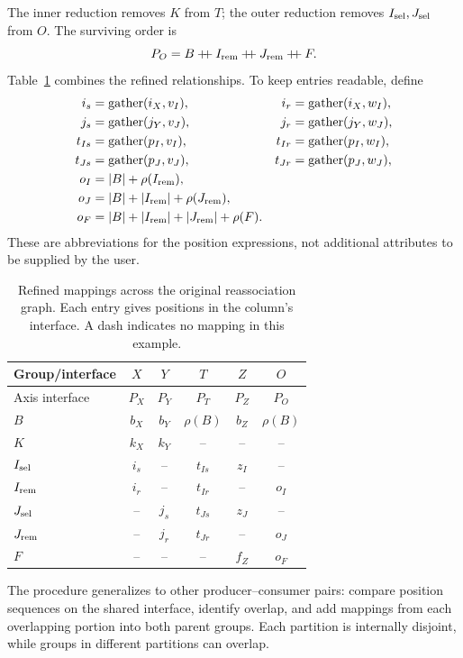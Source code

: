 The inner reduction removes $K$ from $T$; the outer reduction removes
$I_{\mathrm{sel}},J_{\mathrm{sel}}$ from $O$. The surviving order is
\begin{equation}
 P_O=B\mathbin{+\!\!+}I_{\mathrm{rem}}\mathbin{+\!\!+}J_{\mathrm{rem}}\mathbin{+\!\!+} F.
\label{eq:source-output}
\end{equation}
Table~\ref{tab:refined-mappings} combines the refined relationships. To keep
entries readable, define
\begin{equation}
\begin{aligned}
 i_s&=\operatorname{gather}(i_X,v_I),&i_r&=\operatorname{gather}(i_X,w_I),\\
 j_s&=\operatorname{gather}(j_Y,v_J),&j_r&=\operatorname{gather}(j_Y,w_J),\\
 t_{Is}&=\operatorname{gather}(p_I,v_I),&t_{Ir}&=\operatorname{gather}(p_I,w_I),\\
 t_{Js}&=\operatorname{gather}(p_J,v_J),&t_{Jr}&=\operatorname{gather}(p_J,w_J),\\
 o_I&=|B|+\rho(I_{\mathrm{rem}}),\\
 o_J&=|B|+|I_{\mathrm{rem}}|+\rho(J_{\mathrm{rem}}),\\
 o_F&=|B|+|I_{\mathrm{rem}}|+|J_{\mathrm{rem}}|+\rho(F).
\end{aligned}
\end{equation}
These are abbreviations for the position expressions, not additional
attributes to be supplied by the user.
\begin{table}[htbp]
\caption{Refined mappings across the original reassociation graph. Each entry
gives positions in the column's interface. A dash indicates no mapping in
this example.}
\label{tab:refined-mappings}
\centering
\begin{tabular}{@{}lccccc@{}}\toprule
Group/interface & $X$ & $Y$ & $T$ & $Z$ & $O$\\\midrule
Axis interface & $P_X$ & $P_Y$ & $P_T$ & $P_Z$ & $P_O$\\
$B$ & $b_X$ & $b_Y$ & $\rho(B)$ & $b_Z$ & $\rho(B)$\\
$K$ & $k_X$ & $k_Y$ & -- & -- & --\\
$I_{\mathrm{sel}}$ & $i_s$ & -- & $t_{Is}$ & $z_I$ & --\\
$I_{\mathrm{rem}}$ & $i_r$ & -- & $t_{Ir}$ & -- & $o_I$\\
$J_{\mathrm{sel}}$ & -- & $j_s$ & $t_{Js}$ & $z_J$ & --\\
$J_{\mathrm{rem}}$ & -- & $j_r$ & $t_{Jr}$ & -- & $o_J$\\
$F$ & -- & -- & -- & $f_Z$ & $o_F$\\\bottomrule
\end{tabular}
\end{table}

The procedure generalizes to other producer--consumer pairs: compare position
sequences on the shared interface, identify overlap, and add mappings from
each overlapping portion into both parent groups. Each partition is internally
disjoint, while groups in different partitions can overlap.

